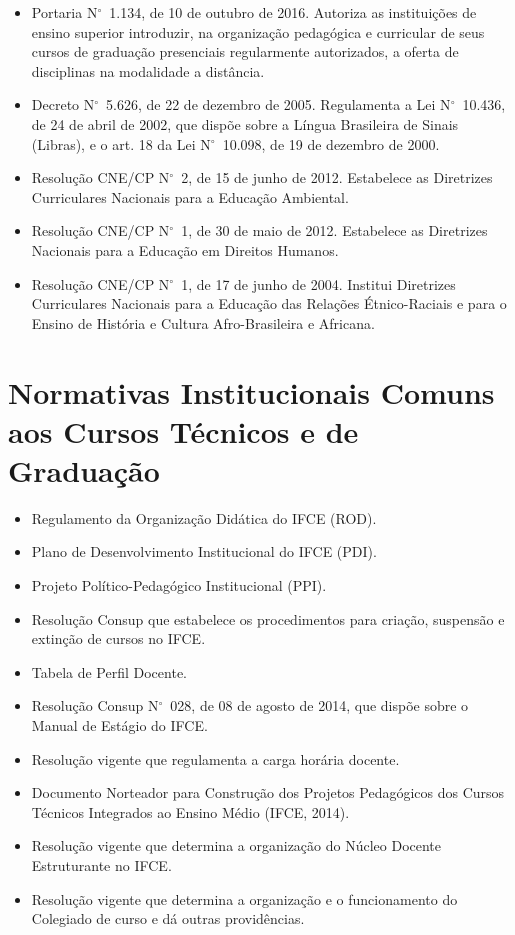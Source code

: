 \documentclass[
	12pt,				%
	openright,			%
	twoside,			%
	a4paper,			%
	chapter=TITLE,		%
	english,			%
	french,				%
	spanish,			%
	brazil,				%
	]{abntex2}
\newcommand{\n}{N$^\circ$}
\begin{document}
\begin{itemize}
    \item  Portaria \n~1.134, de 10 de outubro de 2016. Autoriza as instituições de ensino superior introduzir, na organização pedagógica e curricular de seus cursos de graduação presenciais regularmente autorizados, a oferta de disciplinas na modalidade a distância.
    \item  Decreto \n~5.626, de 22 de dezembro de 2005. Regulamenta a Lei \n~10.436, de 24 de abril de 2002, que dispõe sobre a Língua Brasileira de Sinais (Libras), e o art. 18 da Lei \n~10.098, de 19 de dezembro de 2000.
    \item Resolução CNE/CP \n~2, de 15 de junho de 2012. Estabelece as Diretrizes Curriculares Nacionais para a Educação Ambiental.
    \item Resolução CNE/CP \n~1, de 30 de maio de 2012. Estabelece as Diretrizes Nacionais para a Educação em Direitos Humanos.
    \item Resolução CNE/CP \n~1, de 17 de junho de 2004. Institui Diretrizes Curriculares Nacionais para a Educação das Relações Étnico-Raciais e para o Ensino de História e Cultura Afro-Brasileira e Africana.
\end{itemize}

\section{Normativas Institucionais Comuns aos Cursos Técnicos e de Graduação}

\begin{itemize}
    \item Regulamento da Organização Didática do IFCE (ROD).
    \item Plano de Desenvolvimento Institucional do IFCE (PDI).
    \item Projeto Político-Pedagógico Institucional (PPI).
    \item Resolução Consup que estabelece os procedimentos para criação, suspensão e extinção de cursos no IFCE.
    \item Tabela de Perfil Docente.
    \item Resolução Consup \n~028, de 08 de agosto de 2014, que dispõe sobre o Manual de Estágio do IFCE.
    \item Resolução vigente que regulamenta a carga horária docente.
    \item Documento Norteador para Construção dos Projetos Pedagógicos dos Cursos Técnicos Integrados ao Ensino Médio (IFCE, 2014).
    \item Resolução vigente que determina a organização do Núcleo Docente Estruturante no IFCE.
    \item Resolução vigente que determina a organização e o funcionamento do Colegiado de curso e dá outras providências.
\end{itemize}
\end{document}
